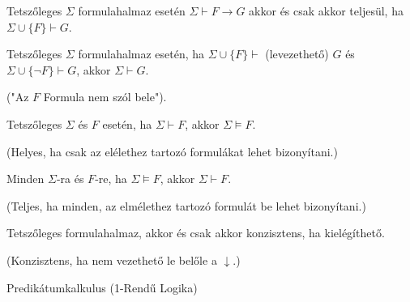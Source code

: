 \documentclass[10pt]{article}
\renewcommand{\\}{\par\noindent}
\begin{document}
\begin{frame}

\begin{tcolorbox}[title={Tétel: Dedukció tétel}]
Tetszőleges $\Sigma$ formulahalmaz esetén $\Sigma \vdash F \rightarrow G$ akkor és csak akkor teljesül, ha $\Sigma \cup \{F\} \vdash G$.
\end{tcolorbox}

\begin{tcolorbox}[title={Tétel: Dichotómia tétel}]
Tetszőleges $\Sigma$ formulahalmaz esetén, ha $\Sigma \cup \{F\} \vdash$ (levezethető) $G$ és $\Sigma \cup \{\neg F\} \vdash G$, akkor $\Sigma \vdash G$.\\
("Az $F$ Formula nem szól bele").
\end{tcolorbox}

\begin{tcolorbox}[title={Tétel: Helyességi tétel}]
Tetszőleges $\Sigma$ és $F$ esetén, ha $\Sigma \vdash F$, akkor $\Sigma \models F$.\\
(Helyes, ha csak az elélethez tartozó formulákat lehet bizonyítani.)
\end{tcolorbox}

\begin{tcolorbox}[title={Tétel: Teljességi tétel}]
Minden $\Sigma$-ra és $F$-re, ha $\Sigma \models F$, akkor $\Sigma \vdash F$.\\
(Teljes, ha minden, az elmélethez tartozó formulát be lehet bizonyítani.)
\end{tcolorbox}

\begin{tcolorbox}[title={Tétel: Konzisztencia tétel}]
Tetszőleges formulahalmaz, akkor és csak akkor konzisztens, ha kielégíthető.\\
(Konzisztens, ha nem vezethető le belőle a $\downarrow$.)
\end{tcolorbox}

\end{frame}


\begin{frame}[plain]
\begin{tcolorbox}[center, colback={myyellow}, coltext={black}, colframe={myyellow}]
    {\Huge Predikátumkalkulus (1-Rendű Logika)}
\end{tcolorbox}
\end{frame}
\end{document}
